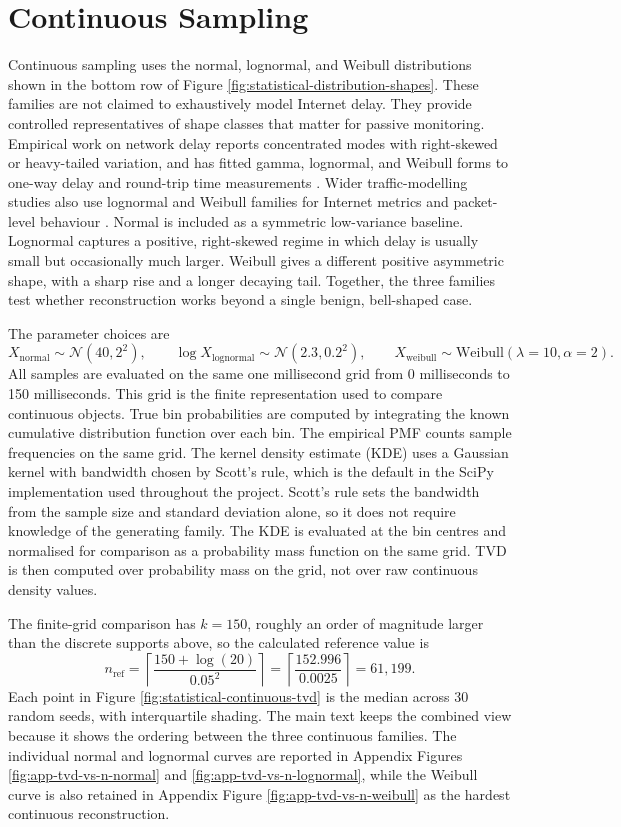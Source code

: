\documentclass[a4paper,11pt]{report}
\begin{document}
\section{Continuous Sampling}

Continuous sampling uses the normal, lognormal, and Weibull distributions shown in the bottom row of Figure \ref{fig:statistical-distribution-shapes}. These families are not claimed to exhaustively model Internet delay. They provide controlled representatives of shape classes that matter for passive monitoring. Empirical work on network delay reports concentrated modes with right-skewed or heavy-tailed variation, and has fitted gamma, lognormal, and Weibull forms to one-way delay and round-trip time measurements \cite{karakasDelay}. Wider traffic-modelling studies also use lognormal and Weibull families for Internet metrics and packet-level behaviour \cite{downeyLognormal,arfeenWeibull}. Normal is included as a symmetric low-variance baseline. Lognormal captures a positive, right-skewed regime in which delay is usually small but occasionally much larger. Weibull gives a different positive asymmetric shape, with a sharp rise and a longer decaying tail. Together, the three families test whether reconstruction works beyond a single benign, bell-shaped case.

The parameter choices are
\[
X_{\mathrm{normal}} \sim \mathcal{N}(40,2^2),
\qquad
\log X_{\mathrm{lognormal}} \sim \mathcal{N}(2.3,0.2^2),
\qquad
X_{\mathrm{weibull}} \sim \mathrm{Weibull}(\lambda=10,\alpha=2).
\]
All samples are evaluated on the same one millisecond grid from 0 milliseconds to 150 milliseconds. This grid is the finite representation used to compare continuous objects. True bin probabilities are computed by integrating the known cumulative distribution function over each bin. The empirical PMF counts sample frequencies on the same grid. The kernel density estimate (KDE) uses a Gaussian kernel with bandwidth chosen by Scott's rule, which is the default in the SciPy implementation used throughout the project. Scott's rule sets the bandwidth from the sample size and standard deviation alone, so it does not require knowledge of the generating family. The KDE is evaluated at the bin centres and normalised for comparison as a probability mass function on the same grid. TVD is then computed over probability mass on the grid, not over raw continuous density values.

The finite-grid comparison has \(k=150\), roughly an order of magnitude larger than the discrete supports above, so the calculated reference value is
\[
n_{\mathrm{ref}} =
\left\lceil \frac{150+\log(20)}{0.05^2} \right\rceil
=
\left\lceil \frac{152.996}{0.0025} \right\rceil
= 61{,}199.
\]
Each point in Figure \ref{fig:statistical-continuous-tvd} is the median across 30 random seeds, with interquartile shading. The main text keeps the combined view because it shows the ordering between the three continuous families. The individual normal and lognormal curves are reported in Appendix Figures \ref{fig:app-tvd-vs-n-normal} and \ref{fig:app-tvd-vs-n-lognormal}, while the Weibull curve is also retained in Appendix Figure \ref{fig:app-tvd-vs-n-weibull} as the hardest continuous reconstruction.
\end{document}

